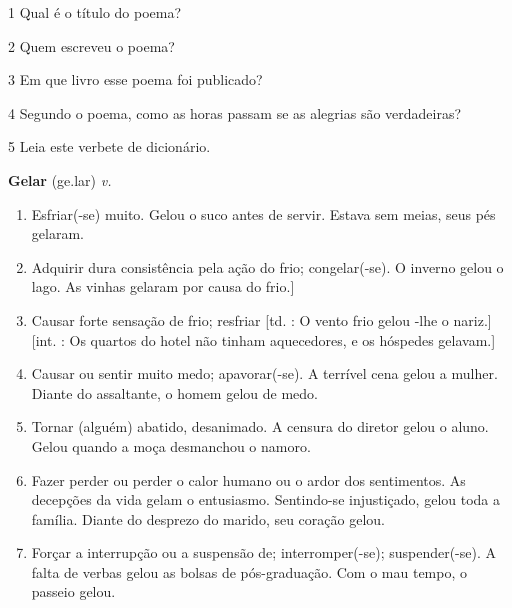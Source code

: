 \num{1} Qual é o título do poema?


\pagebreak
\num{2} Quem escreveu o poema?


\num{3} Em que livro esse poema foi publicado?


\num{4} Segundo o poema, como as horas passam se as alegrias são verdadeiras?


\num{5} Leia este verbete de dicionário.

\begin{myquote}
\textbf{Gelar} (ge.lar)
\textit{v.}

\begin{enumerate}
\item Esfriar(-se) muito.
Gelou o suco antes de servir.
Estava sem meias, seus pés gelaram.

\item Adquirir dura consistência pela ação do frio; congelar(-se).
O inverno gelou o lago.
As vinhas gelaram por causa do frio.]

\item Causar forte sensação de frio; resfriar [td. : O vento frio gelou -lhe o nariz.] [int. : Os quartos do hotel não tinham aquecedores, e os hóspedes gelavam.]

\item Causar ou sentir muito medo; apavorar(-se).
A terrível cena gelou a mulher.
Diante do assaltante, o homem gelou de medo.

\item Tornar (alguém) abatido, desanimado.
A censura do diretor gelou o aluno.
Gelou quando a moça desmanchou o namoro.

\item Fazer perder ou perder o calor humano ou o ardor dos sentimentos.
As decepções da vida gelam o entusiasmo.
Sentindo-se injustiçado, gelou toda a família.
Diante do desprezo do marido, seu coração gelou.

\item Forçar a interrupção ou a suspensão de; interromper(-se); suspender(-se).
A falta de verbas gelou as bolsas de pós-graduação.
Com o mau tempo, o passeio gelou.
\end{enumerate}

\end{myquote}

